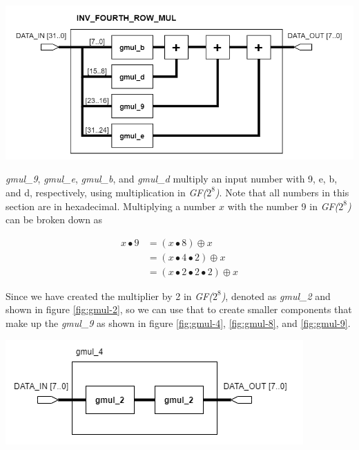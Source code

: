\documentclass[a4paper, 10pt]{article}
\newenvironment{Figure}
    {\par\medskip\noindent\minipage{\linewidth}}
    {\endminipage\par\medskip}
\begin{document}
\begin{multicols}{2}
	\noindent
            \begin{Figure}
                \centering
                \includegraphics[width=\linewidth]{InvMixColumns-Inv_Fourth_Row_Mul.png}
                \label{fig:invfourthrowmul}
            \end{Figure}

	\textit{gmul\_9}, \textit{gmul\_e}, \textit{gmul\_b}, and \textit{gmul\_d} multiply an input number with 9, e, b, and d, respectively, using multiplication in \textit{GF($2^{8}$)}. Note that all numbers in this section are in hexadecimal. Multiplying a number $x$ with the number 9 in \textit{GF($2^{8}$)} can be broken down as 

\begin{equation}
\begin{aligned}
	x \bullet 9 &= \left(x \bullet 8\right) \oplus x \\
	&= \left(x \bullet 4 \bullet 2\right) \oplus x \\
	&= \left(x \bullet 2 \bullet 2 \bullet 2\right) \oplus x
\end{aligned}
\end{equation}

	Since we have created the multiplier by 2 in \textit{GF($2^{8}$)}, denoted as \textit{gmul\_2} and shown in figure \ref{fig:gmul-2}, so we can use that to create smaller components that make up the \textit{gmul\_9} as shown in figure \ref{fig:gmul-4}, \ref{fig:gmul-8}, and \ref{fig:gmul-9}.

	\noindent
            \begin{Figure}
                \centering
                \includegraphics[width=\linewidth]{InvMixColumns-gmul_4.png}
                \label{fig:gmul-4}
            \end{Figure}


\end{multicols}
\end{document}
